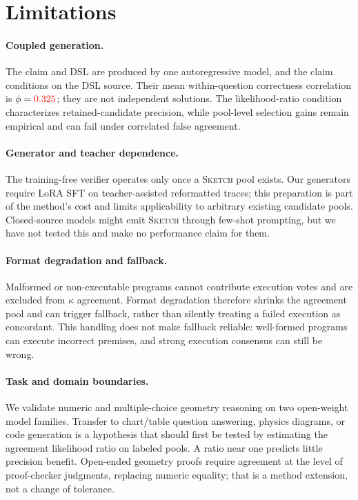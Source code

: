 \documentclass{article}
\newcommand{\sketch}{\textsc{Sketch}}
\newcommand{\recheck}[1]{\textcolor{red}{#1}}
\begin{document}
\section{Limitations}
\label{sec:limitations}

\paragraph{Coupled generation.}
The claim and DSL are produced by one autoregressive model, and the claim conditions on the DSL source. Their mean within-question correctness correlation is $\phi=\recheck{0.325}$; they are not independent solutions. The likelihood-ratio condition characterizes retained-candidate precision, while pool-level selection gains remain empirical and can fail under correlated false agreement.

\paragraph{Generator and teacher dependence.}
The training-free verifier operates only once a \sketch{} pool exists. Our generators require LoRA SFT on teacher-assisted reformatted traces; this preparation is part of the method's cost and limits applicability to arbitrary existing candidate pools. Closed-source models might emit \sketch{} through few-shot prompting, but we have not tested this and make no performance claim for them.

\paragraph{Format degradation and fallback.}
Malformed or non-executable programs cannot contribute execution votes and are excluded from $\kappa$ agreement. Format degradation therefore shrinks the agreement pool and can trigger fallback, rather than silently treating a failed execution as concordant. This handling does not make fallback reliable: well-formed programs can execute incorrect premises, and strong execution consensus can still be wrong.

\paragraph{Task and domain boundaries.}
We validate numeric and multiple-choice geometry reasoning on two open-weight model families. Transfer to chart/table question answering, physics diagrams, or code generation is a hypothesis that should first be tested by estimating the agreement likelihood ratio on labeled pools. A ratio near one predicts little precision benefit. Open-ended geometry proofs require agreement at the level of proof-checker judgments, replacing numeric equality; that is a method extension, not a change of tolerance.
\end{document}
